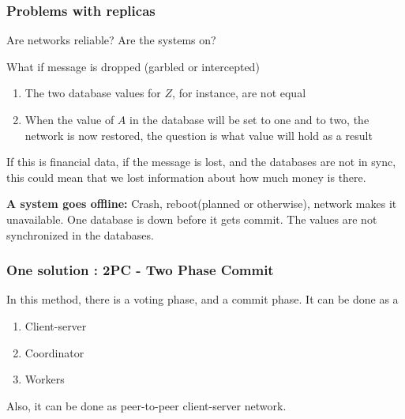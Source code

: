 \subsubsection{Problems with replicas}

Are networks reliable?
Are the systems on?

\begin{example}{What if message is dropped (garbled or intercepted)}
\begin{enumerate}[noitemsep]
	\item The two database values for $Z$, for instance, are not equal
\item When the value of $A$ in the database will be set to one and to two, the network is now restored, the question is what value will hold as a result
\end{enumerate}
\end{example}

If this is financial data, if the message is lost, and the databases are not in sync, this could mean that we lost information about how much money is there.

\textbf{A system goes offline:} Crash, reboot(planned or otherwise), network makes it unavailable. One database is down before it gets commit. The values are not synchronized in the databases.


\subsubsection{One solution : 2PC - Two Phase Commit}
In this method, there is a voting phase, and a commit phase. It can be done as a 
\begin{enumerate}[label=\roman*), noitemsep, topsep=1pt]
\item Client-server
\item Coordinator
\item Workers
\end{enumerate} 
Also, it can be done as peer-to-peer client-server network.

